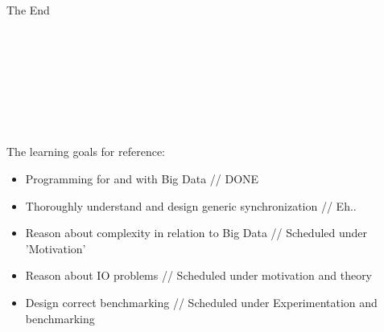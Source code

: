 \documentclass[a4paper]{article}
\begin{document}
The End \\\\\\\\\\\\\\\\\\

The learning goals for reference:

\begin{itemize}
  \item Programming for and with Big Data  // DONE
  \item Thoroughly understand and design generic synchronization  // Eh..
  \item Reason about complexity in relation to Big Data // Scheduled under 'Motivation'
  \item Reason about IO problems  // Scheduled under motivation and theory
  \item Design correct benchmarking  // Scheduled under Experimentation and benchmarking
\end{itemize}
\end{document}
